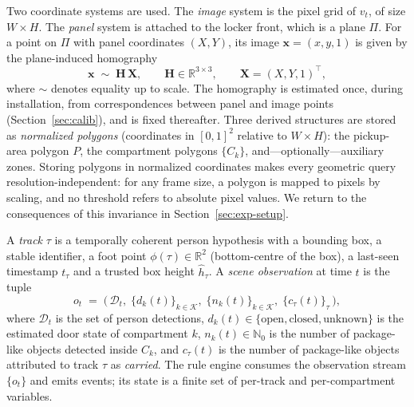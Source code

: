 \documentclass[journal,article,submit,oneauthor]{Definitions/mdpi}
\begin{document}
Two coordinate systems are used. The \emph{image} system is the pixel grid of $v_t$, of size
$W\times H$. The \emph{panel} system is attached to the locker front, which is a plane
$\Pi$. For a point on $\Pi$ with panel coordinates $(X,Y)$, its image $\mathbf{x}=(x,y,1)$ is
given by the plane-induced homography
\begin{equation}
\label{eq:homography}
\mathbf{x} \;\sim\; \mathbf{H}\,\mathbf{X},
\qquad
\mathbf{H} \in \mathbb{R}^{3\times 3},
\qquad
\mathbf{X}=(X,Y,1)^{\top},
\end{equation}
where $\sim$ denotes equality up to scale. The homography is estimated once, during
installation, from correspondences between panel and image points (Section~\ref{sec:calib}),
and is fixed thereafter. Three derived structures are stored as \emph{normalized polygons}
(coordinates in $[0,1]^2$ relative to $W\times H$): the pickup-area polygon $P$, the
compartment polygons $\{C_k\}$, and---optionally---auxiliary zones. Storing polygons in
normalized coordinates makes every geometric query resolution-independent: for any frame
size, a polygon is mapped to pixels by scaling, and no threshold refers to absolute pixel
values. We return to the consequences of this invariance in Section~\ref{sec:exp-setup}.

A \emph{track} $\tau$ is a temporally coherent person hypothesis with a bounding box, a
stable identifier, a foot point $\phi(\tau)\in\mathbb{R}^2$ (bottom-centre of the box), a
last-seen timestamp $t_\tau$ and a trusted box height $\hat{h}_\tau$. A \emph{scene
observation} at time $t$ is the tuple
\begin{equation}
\label{eq:observation}
o_t \;=\; \bigl(\, \mathcal{D}_t,\; \{d_k(t)\}_{k\in\mathcal{K}},\;
\{n_k(t)\}_{k\in\mathcal{K}},\; \{c_\tau(t)\}_{\tau} \,\bigr),
\end{equation}
where $\mathcal{D}_t$ is the set of person detections, $d_k(t)\in\{\text{open},\text{closed},
\text{unknown}\}$ is the estimated door state of compartment $k$, $n_k(t)\in\mathbb{N}_0$ is
the number of package-like objects detected inside $C_k$, and $c_\tau(t)$ is the number of
package-like objects attributed to track $\tau$ as \emph{carried}. The rule engine consumes
the observation stream $\{o_t\}$ and emits events; its state is a finite set of per-track and
per-compartment variables.
\end{document}
